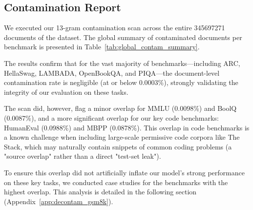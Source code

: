 \subsection{Contamination Report}
\label{app:contam_report}

We executed our 13-gram contamination scan across the entire \num{345697271} documents of the \MixtureVitae{} dataset. The global summary of contaminated documents per benchmark is presented in Table~\ref{tab:global_contam_summary}.

The results confirm that for the vast majority of benchmarks—including ARC, HellaSwag, LAMBADA, OpenBookQA, and PIQA—the document-level contamination rate is negligible (at or below 0.0003\%), strongly validating the integrity of our evaluation on these tasks.

The scan did, however, flag a minor overlap for MMLU (0.0098\%) and BoolQ (0.0087\%), and a more significant overlap for our key code benchmarks: HumanEval (0.0988\%) and MBPP (0.0878\%). This overlap in code benchmarks is a known challenge when including large-scale permissive code corpora like The Stack, which may naturally contain snippets of common coding problems (a "source overlap" rather than a direct "test-set leak").

To ensure this overlap did not artificially inflate our model's strong performance on these key tasks, we conducted case studies for the benchmarks with the highest overlap. This analysis is detailed in the following section (Appendix~\ref{app:decontam_gsm8k}).


